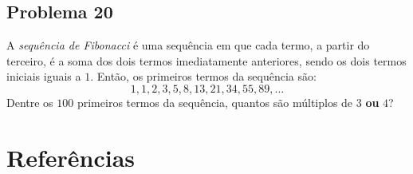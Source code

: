 \documentclass[12pt]{article}
\begin{document}
\clearpage

\subsection{Problema 20}
\begin{tcolorbox}[statementbox]
  A \textit{sequência de Fibonacci} é uma sequência em que cada termo, a partir do terceiro, é a soma dos dois termos imediatamente
  anteriores, sendo os dois termos iniciais iguais a $1$. Então, os primeiros termos da sequência são:
  \[
    1, 1, 2, 3, 5, 8, 13, 21, 34, 55, 89, \dots
  \]
  Dentre os $100$ primeiros termos da sequência, quantos são múltiplos de $3$ \textbf{ou} $4$?
\end{tcolorbox}

  \clearpage

  \section{\textsf{Referências}}
\end{document}
